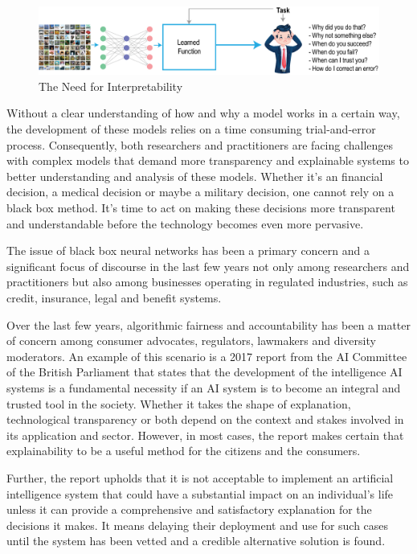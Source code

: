 \begin{figure}[htbp]
\centering
\includegraphics[width=1\textwidth]{images/xa-concept-part-1.eps}
\caption{The Need for Interpretability}
\label{fig:Why Interpretability Matters}
\end{figure}

Without a clear understanding of how and why a model works in a certain way, the development of these models relies on a time consuming trial-and-error process. Consequently, both researchers and practitioners are facing challenges with complex models that demand more transparency and explainable systems to better understanding and analysis of these models. Whether it's an financial decision, a medical decision or maybe a military decision, one cannot rely on a black box method. It's time to act on making these decisions more transparent and understandable before the technology becomes even more pervasive.

The issue of black box neural networks has been a primary concern and a significant focus of discourse in the last few years not only among researchers and practitioners \cite{Samek} but also among businesses operating in regulated industries, such as credit, insurance, legal and benefit systems. 

Over the last few years, algorithmic fairness and accountability has been a matter of concern among consumer advocates, regulators, lawmakers and diversity moderators. An example of this scenario is a 2017 report from the AI Committee of the British Parliament \cite{Hagras2018} that states that the development of the intelligence AI systems is a fundamental necessity if an AI system is to become an integral and trusted tool in the society. Whether it takes the shape of explanation, technological transparency or both depend on the context and stakes involved in its application and sector. However, in most cases, the report makes certain that explainability to be a useful method for the citizens and the consumers. 

Further, the report upholds that it is not acceptable to implement an artificial intelligence system that could have a substantial impact on an individual's life unless it can provide a comprehensive and satisfactory explanation for the decisions it makes. It means delaying their deployment and use for such cases until the system has been vetted and a credible alternative solution is found.

